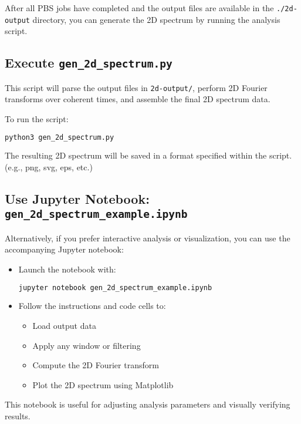 \documentclass{article}
\begin{document}
After all PBS jobs have completed and the output files are available in the \texttt{./2d-output} directory, you can generate the 2D spectrum by running the analysis script.

\subsection*{Execute \texttt{gen\_2d\_spectrum.py}}

This script will parse the output files in \texttt{2d-output/}, perform 2D Fourier transforms over coherent times, and assemble the final 2D spectrum data.

To run the script:

\begin{lstlisting}[language=bash]
python3 gen_2d_spectrum.py
\end{lstlisting}

\noindent The resulting 2D spectrum will be saved in a format specified within the script. (e.g., png, svg, eps, etc.)

\subsection*{Use Jupyter Notebook: \texttt{gen\_2d\_spectrum\_example.ipynb}}

Alternatively, if you prefer interactive analysis or visualization, you can use the accompanying Jupyter notebook:

\begin{itemize}
    \item Launch the notebook with:
    \begin{lstlisting}[language=bash]
    jupyter notebook gen_2d_spectrum_example.ipynb
    \end{lstlisting}
    \item Follow the instructions and code cells to:
    \begin{itemize}
        \item Load output data
        \item Apply any window or filtering
        \item Compute the 2D Fourier transform
        \item Plot the 2D spectrum using Matplotlib
    \end{itemize}
\end{itemize}

This notebook is useful for adjusting analysis parameters and visually verifying results.
\end{document}

